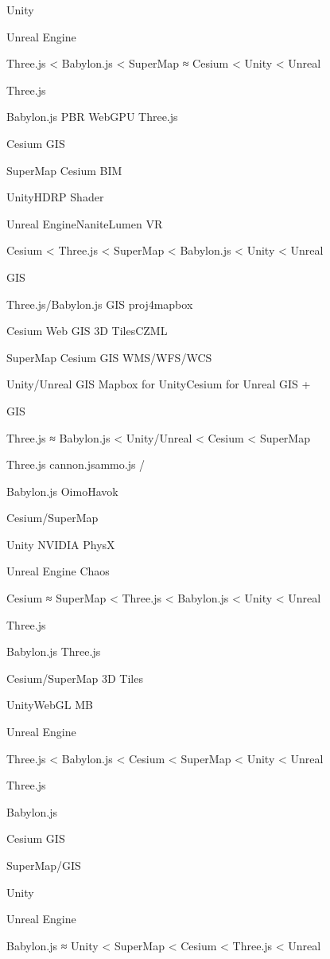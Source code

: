 Unity

Unreal Engine

Three.js \textless{} Babylon.js \textless{} SuperMap ≈ Cesium
\textless{} Unity \textless{} Unreal

Three.js

Babylon.js PBR WebGPU Three.js

Cesium GIS

SuperMap Cesium BIM

UnityHDRP Shader

Unreal EngineNaniteLumen VR

Cesium \textless{} Three.js \textless{} SuperMap \textless{} Babylon.js
\textless{} Unity \textless{} Unreal

GIS

Three.js/Babylon.js GIS proj4mapbox

Cesium Web GIS 3D TilesCZML

SuperMap Cesium GIS WMS/WFS/WCS

Unity/Unreal GIS Mapbox for UnityCesium for Unreal GIS +

GIS

Three.js ≈ Babylon.js \textless{} Unity/Unreal \textless{} Cesium
\textless{} SuperMap

Three.js cannon.jsammo.js /

Babylon.js OimoHavok

Cesium/SuperMap

Unity NVIDIA PhysX

Unreal Engine Chaos

Cesium ≈ SuperMap \textless{} Three.js \textless{} Babylon.js
\textless{} Unity \textless{} Unreal

Three.js

Babylon.js Three.js

Cesium/SuperMap 3D Tiles

UnityWebGL MB

Unreal Engine

Three.js \textless{} Babylon.js \textless{} Cesium \textless{} SuperMap
\textless{} Unity \textless{} Unreal

Three.js

Babylon.js

Cesium GIS

SuperMap/GIS

Unity

Unreal Engine

Babylon.js ≈ Unity \textless{} SuperMap \textless{} Cesium \textless{}
Three.js \textless{} Unreal

